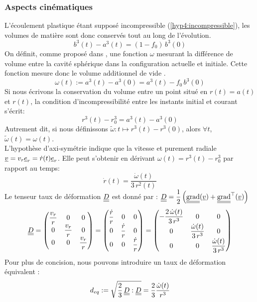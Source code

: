 \documentclass[10pt]{book}
\begin{document}
\subsubsection{Aspects cinématiques}
L'écoulement plastique étant supposé incompressible (\ref{hyp4:incompressible}), les volumes de matière sont donc conservés tout au long de l'évolution.
 $$b^3(t)-a^3(t) = (1-f_0)\,b^3(0)$$
On définit, comme proposé dans \cite{Duplay_RI2004}, une fonction $\omega$ mesurant la différence de volume entre la cavité sphérique dans la configuration actuelle et initiale. Cette fonction mesure donc le \og volume additionnel de vide \fg{}.
\begin{equation}
\omega(t):=a^3(t)-a^3(0)=a^3(t)-f_0\,b^3(0)
\label{eq:defi_fonction_omega}
\end{equation}
Si nous écrivons la conservation du volume entre un point situé en $r(t)=a(t)$ et $r(t)$, la condition d’incompressibilité entre les instants initial et courant s'écrit:
$$r^{3}(t)-r^{3}_{0}=a^{3}(t)-a^{3}(0)$$
Autrement dit, si nous définissons $\tilde{\omega}:t\mapsto r^{3}(t)-r^{3}(0)$, alors $\forall t$, $\tilde{\omega}(t)=\omega(t)$.\\

L'hypothèse d'axi-symétrie indique que la vitesse et purement radiale $\underline{v}=v_{r}\underline{e}_{r}=\dot{r}(t)\underline{e}_{r}$. Elle peut s'obtenir en dérivant $\omega(t)=r^3(t)-r_0^3$ par rapport au temps:
\begin{equation}
\dot{r}(t)=\dfrac{\dot{\omega}(t)}{3\,r^2(t)}
\label{eq:rel_dot_r_omega}
\end{equation}
Le tenseur taux de déformation $\underline{\underline{D}}$ est donné par : $\underline{\underline{D}}=\dfrac{1}{2}\left(\underline{\underline{\textmd{grad}}}(\underline{v})+\underline{\underline{\textmd{grad}}}^\top(\underline{v})\right)$
$$\underline{\underline{D}}= \begin{pmatrix}
\dfrac{v_r}{r}  & 0 & 0 \\
0 & \dfrac{v_r}{r}  & 0 \\
0 & 0 & \dfrac{v_r}{r} 
\end{pmatrix} = \begin{pmatrix}
\dfrac{\dot{r}}{r}  & 0 & 0 \\
0 & \dfrac{\dot{r}}{r}  & 0 \\
0 & 0 & \dfrac{\dot{r}}{r} 
\end{pmatrix} = \begin{pmatrix}
-\dfrac{2\,\dot{\omega}(t)}{3\,r^3} & 0 & 0 \\
0 & \dfrac{\dot{\omega}(t)}{3\,r^3}  & 0 \\
0 & 0 & \dfrac{\dot{\omega}(t)}{3\,r^3} 
\end{pmatrix}$$
Pour plus de concision, nous pouvons introduire un \og taux de déformation équivalent \fg{}:
\begin{equation}
d_{eq}:=\sqrt{\dfrac{2}{3}\,\underline{\underline{D}}:\underline{\underline{D}}}=\dfrac{2}{3}\dfrac{\dot{\omega}(t)}{r^3}
\label{eq:defi_taux_defo_equiv}
\end{equation}
\end{document}
